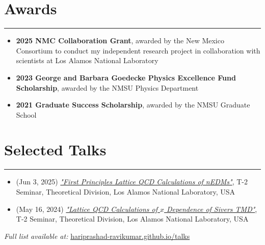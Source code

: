 \documentclass[11pt]{article}
\begin{document}
\section*{Awards}
\hrule
\vspace{-0.3em}

\begin{itemize}
    \item \textbf{2025 NMC Collaboration Grant}, awarded by the New Mexico Consortium to conduct my independent research project in collaboration with scientists at Los Alamos National Laboratory
    \vspace{-0.5em}
    \item \textbf{2023 George and Barbara Goedecke Physics Excellence Fund Scholarship}, awarded by the NMSU Physics Department
    \vspace{-0.5em}
    \item \textbf{2021 Graduate Success Scholarship}, awarded by the NMSU Graduate School
\end{itemize}

\section*{Selected Talks}
\hrule
\vspace{-0.3em}
\begin{itemize}
    \item (Jun 3, 2025) \href{https://hariprashad-ravikumar.github.io/talks/Los_Alamos_T2_talk_First_Principles_Lattice_QCD_Calculations_of_nEDMs__presentation_Hari_NMSU_June_03_2025.pdf}{\textit{"First Principles Lattice QCD Calculations of nEDMs"}}, T-2 Seminar, Theoretical Division, Los Alamos National Laboratory, USA

    
    \item (May 16, 2024) \href{https://hariprashad-ravikumar.github.io/talks/Lattice_QCD_calculations_of_Sivers_TMD_x_dependance____presentation_Hari__NMSU_May_16_2024.pdf}{\textit{"Lattice QCD Calculations of $x$ Dependence of Sivers TMD"}}, T-2 Seminar, Theoretical Division, Los Alamos National Laboratory, USA
    
\end{itemize}

\noindent\textit{Full list available at:} \href{https://hariprashad-ravikumar.github.io/talks}{hariprashad-ravikumar.github.io/talks}
\end{document}
